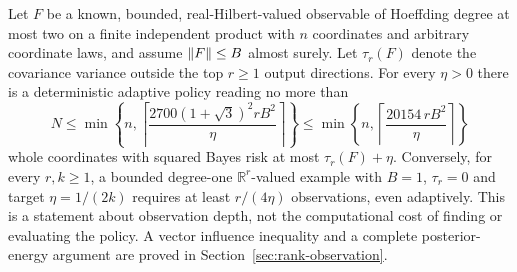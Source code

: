 \begin{theorem}\label{thm:rankadaptive}
Let $F$ be a known, bounded, real-Hilbert-valued observable of Hoeffding degree at most two on a finite independent product with $n$ coordinates and arbitrary coordinate laws, and assume $\lVert F\rVert\le B$ almost surely. Let $\tau_r(F)$ denote the covariance variance outside the top $r\ge1$ output directions. For every $\eta>0$ there is a deterministic adaptive policy reading no more than
\begin{equation}\label{eq:rankcap}
 N\le\min\left\{n,\left\lceil\frac{2700(1+\sqrt3)^2r B^2}{\eta}\right\rceil\right\}
 \le\min\left\{n,\left\lceil\frac{20154\,rB^2}{\eta}\right\rceil\right\}
\end{equation}
whole coordinates with squared Bayes risk at most $\tau_r(F)+\eta$. Conversely, for every $r,k\ge1$, a bounded degree-one $\mathbb R^r$-valued example with $B=1$, $\tau_r=0$ and target $\eta=1/(2k)$ requires at least $r/(4\eta)$ observations, even adaptively. This is a statement about observation depth, not the computational cost of finding or evaluating the policy. A vector influence inequality and a complete posterior-energy argument are proved in Section~\ref{sec:rank-observation}.
\end{theorem}
